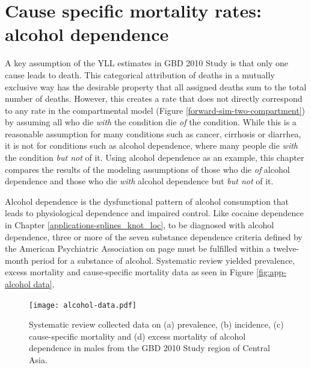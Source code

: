 \chapter{Cause specific mortality rates: alcohol dependence}
\label{applications-csmr}

A key assumption of the YLL estimates in GBD 2010 Study is that only
one cause leads to death.  This categorical attribution of deaths in
a mutually exclusive way has the desirable property that all assigned 
deaths sum to the total number of deaths.  However, this
creates a rate that does not directly correspond to any rate in the
compartmental model (Figure \ref{forward-sim-two-compartment}) by
assuming all who die \emph{with} the condition die \emph{of} the
condition.  While this is a reasonable assumption for many conditions
such as cancer, cirrhosis or diarrhea, it is not for conditions such as
alcohol dependence, where many people die \emph{with}
the condition \emph{but not} of it.  Using alcohol dependence as an
example, this chapter compares the results of
the modeling assumptions of those who die \emph{of} alcohol dependence
and those who die \emph{with} alcohol dependence but \emph{but not} of it.

Alcohol dependence is the dysfunctional pattern of alcohol consumption
that leads to physiological dependence and impaired control.  Like
cocaine dependence in Chapter \ref{applications-splines_knot_loc}, to
be diagnosed with alcohol dependence, three or more of the seven
substance dependence criteria defined by the American Psychiatric
Association on page \pageref{page:app-substance_dependence} must be
fulfilled within a twelve-month period for a substance of alcohol.
\cite{american_psychiatric_association_diagnostic_2000, hasin_prevalence_2007}
Systematic review yielded prevalence, excess mortality and
cause-specific mortality data as seen in Figure \ref{fig:app-alcohol
  data}.

    \begin{figure}[h]
        \begin{center}
            \texttt{[image: alcohol-data.pdf]}
            \caption{Systematic review collected data on (a) prevalence,
              (b) incidence, (c) cause-specific mortality and (d) excess
              mortality of alcohol dependence in males from the GBD 2010
              Study region of Central Asia.}
            \label{fig:app-alcohol data}
        \end{center}
    \end{figure}

